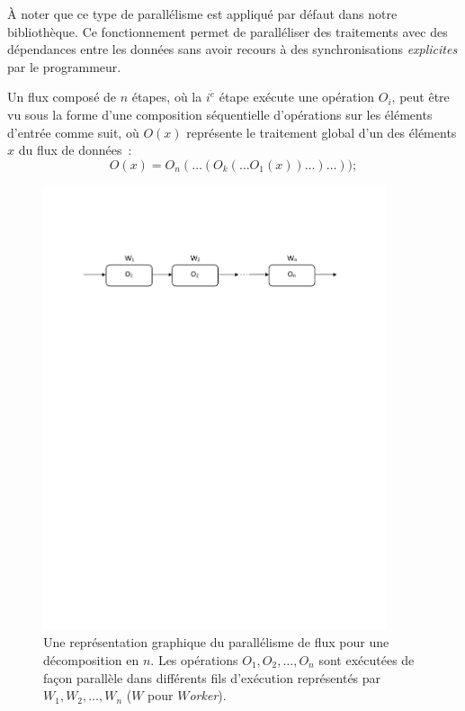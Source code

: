 \`A noter que ce type de parall\'elisme est appliqu\'e par d\'efaut dans notre biblioth\`eque. 
%
Ce fonctionnement permet de parall\'eliser des traitements avec des d\'ependances entre les donn\'ees sans avoir recours \`a des synchronisations \emph{explicites} par le programmeur. 

\goodbreak
\begin{samepage}
Un flux compos\'e de $n$ {étapes}, o\`u la $i^{\grave e}$ étape ex\'ecute une op\'eration $O_i$, peut \^etre vu sous la forme d'une composition s\'equentielle d'op\'erations sur les \'el\'ements d'entr\'ee comme suit, o\`u $O(x)$ repr\'esente le traitement global d'un des \'el\'ements $x$ du flux de données~: 
%
\[
	O(x) = O_n( \ldots (O_k( \ldots O_1(x)) \ldots ) \ldots ));
\]
\end{samepage}


\begin{figure}

\centering
     \includegraphics[width=0.9\textwidth]{Figures/ParallelismeDuFlux.pdf}
      \caption[Une repr\'esentation graphique du parall\'elisme de flux en \ppff.]{Une repr\'esentation graphique du parall\'elisme de flux pour une d\'ecomposition en $n$. Les op\'erations $O_1, O_2, \ldots, O_n$ sont ex\'ecut\'ees de fa\c{c}on parall\`ele dans diff\'erents fils d'ex\'ecution représentés par $W_1, W_2, \ldots, W_n$ ($W$ pour \emph{$W$orker}).}
       \label{ParallelismeDuFlux.fig}
\end{figure}


